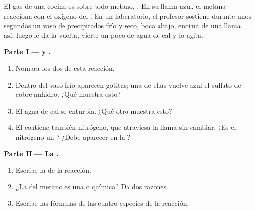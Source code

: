 \begin{problem}
\label{pb:g7:chemical-reactions:1}
El gas de una cocina es sobre todo metano, . En su llama azul,
el metano reacciona con el oxígeno del . En un laboratorio, el
profesor sostiene durante unos segundos un vaso de precipitados frío y
seco, boca abajo, encima de una llama así; luego le da la vuelta, vierte
un poco de agua de cal y lo agita.

\medskip
\noindent\textbf{Parte I ---  y .}
\begin{enumerate}
  \item Nombra los dos  de esta reacción.
  \item Dentro del vaso frío aparecen gotitas; una de ellas vuelve azul
        el sulfato de cobre anhidro. ¿Qué  muestra esto?
  \item El agua de cal se enturbia. ¿Qué otro  muestra esto?
  \item El  contiene también nitrógeno, que atraviesa la llama sin
        cambiar. ¿Es el nitrógeno un ? ¿Debe aparecer en la
        ?
\end{enumerate}

\medskip
\noindent\textbf{Parte II --- La .}
\begin{enumerate}[resume]
  \item Escribe la  de la reacción.
  \item ¿La  del metano es una  o
        química? Da dos razones.
  \item Escribe las fórmulas de las cuatro especies de la reacción.
\end{enumerate}


\end{problem}
